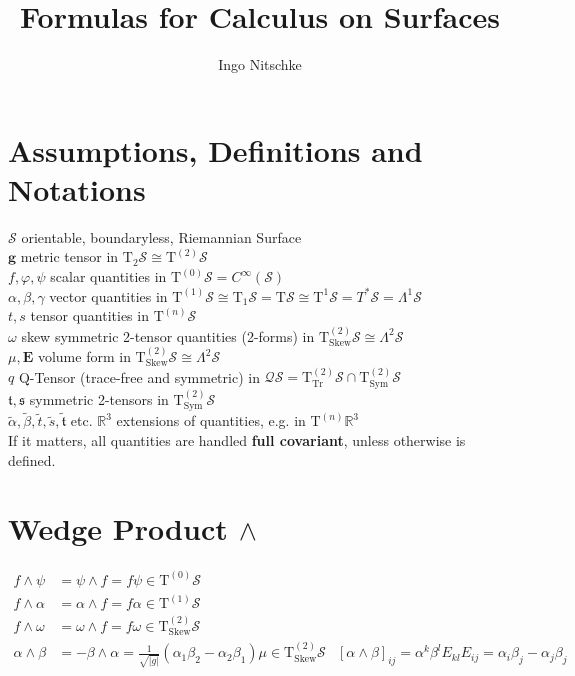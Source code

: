 \documentclass[a4paper,7pt]{scrartcl}
\title{Formulas for Calculus on Surfaces}
\author{Ingo Nitschke}
\newcommand{\surf}{\mathcal{S}}
\newcommand{\T}{\mathrm{T}}
\newcommand{\R}{\mathds{R}}
\newcommand{\tps}[1]{\T^{(#1)}\surf}
\newcommand{\tzs}{\tps{0}}
\newcommand{\tos}{\tps{1}}
\newcommand{\tts}{\tps{2}}
\newcommand{\tns}{\tps{n}}
\newcommand{\tpsprop}[2]{\T^{(#1)}_{#2}\surf}
\newcommand{\ttssym}{\tpsprop{2}{\mathrm{Sym}}}
\newcommand{\ttsskew}{\tpsprop{2}{\mathrm{Skew}}}
\newcommand{\ttstrfree}{\tpsprop{2}{\mathrm{Tr}}}
\newcommand{\qts}{\mathcal{Q}\surf}
\newcommand{\volval}{\sqrt{| g |}}
\newcommand{\gb}{\mathbf{g}}
\newcommand{\Eb}{\mathbf{E}}
\newcommand{\tsym}{\mathfrak{t}}
\newcommand{\ssym}{\mathfrak{s}}
\newcommand{\ttsym}{\tilde{\tsym}}
\begin{document}
\maketitle
\tableofcontents

\section{Assumptions, Definitions and Notations}
\( \surf \) \dotfill orientable, boundaryless, Riemannian Surface\\
\( \gb \) \dotfill metric tensor in \( \T_{2}\surf \cong \tts \)\\
\( f,\varphi,\psi \) \dotfill scalar quantities in \( \tzs = C^{\infty}\left( \surf \right)\)\\
\( \alpha,\beta,\gamma \) \dotfill vector quantities in \( \tos \cong \T_{1}\surf = \T\surf \cong \T^{1}\surf = T^{*}\surf = \Lambda^{1}\surf \)\\
\( t,s \) \dotfill tensor quantities in \( \tns \)\\
\( \omega \) \dotfill skew symmetric 2-tensor quantities (2-forms) in \( \ttsskew \cong \Lambda^{2}\surf \)\\
\( \mu, \Eb\) \dotfill volume form in \( \ttsskew \cong \Lambda^{2}\surf \)\\
\( q \) \dotfill Q-Tensor (trace-free and symmetric) in \( \qts = \ttstrfree \cap \ttssym \)\\
\( \tsym, \ssym \) \dotfill symmetric 2-tensors in \( \ttssym \)\\
\( \tilde{\alpha}, \tilde{\beta}, \tilde{t}, \tilde{s}, \ttsym\) etc. \dotfill \( \R^{3} \) extensions of quantities, e.g. in \( \T^{(n)}\R^{3} \)\\
If it matters, all quantities are handled \textbf{full covariant}, unless otherwise is defined.


\section{Wedge Product \( \wedge \)}
\begin{align*}
  f\wedge\psi &= \psi\wedge f  = f\psi \in \tzs \\
  f\wedge\alpha &= \alpha\wedge f = f\alpha \in \tos\\
  f\wedge\omega &= \omega\wedge f = f\omega \in \ttsskew\\
  \alpha\wedge\beta &= -\beta\wedge\alpha = \frac{1}{\volval}\left( \alpha_{1}\beta_{2} - \alpha_{2}\beta_{1} \right)\mu \in \ttsskew
                  & \left[ \alpha\wedge\beta \right]_{ij} = \alpha^{k}\beta^{l}E_{kl}E_{ij}
                                                          = \alpha_{i}\beta_{j} - \alpha_{j}\beta_{j}
\end{align*}
\end{document}
